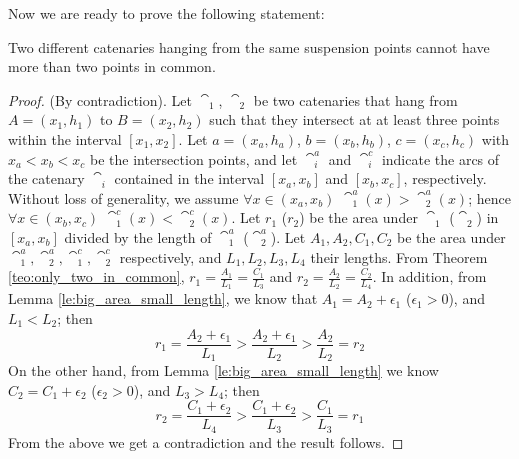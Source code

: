 Now we are ready to prove the following statement:
\begin{theorem}\label{teo:only_two_in_common}
Two different catenaries hanging from the same suspension points cannot have more than two points in common.
\end{theorem}
\begin{proof}
    (By contradiction). Let $\cat_1$, $\cat_2$ be two catenaries that hang from $A=(x_1, h_1)$ to $B=(x_2, h_2)$ such that they intersect at at least three points within the interval $[x_1, x_2]$. Let $a=(x_a, h_a)$, $b=(x_b, h_b)$, $c=(x_c, h_c)$ with $x_a<x_b<x_c$ be the intersection points,
    and let $\cat_i^a$ and $\cat_i^c$ indicate the arcs of the catenary $\cat_i$ contained in the interval $[x_a, x_b]$ and $[x_b, x_c]$, respectively. Without loss of generality, we assume $\forall x\in (x_a, x_b)$ $\cat_1^a(x)> \cat_2^a(x)$; hence $\forall x\in (x_b, x_c)$ $\cat_1^c(x)< \cat_2^c(x)$. Let $r_1$ ($r_2$) be the area under $\cat_1$ ($\cat_2$) in $[x_a, x_b]$ divided by the length of $\cat_1^a$ ($\cat_2^a$). Let $A_1, A_2, C_1, C_2$ be the area under $\cat_1^a,\cat_2^a, \cat_1^c,\cat_2^c$ respectively, and $L_1, L_2, L_3, L_4$ their lengths. From Theorem \ref{teo:only_two_in_common}, $r_1=\frac{A_1}{L_1}=\frac{C_1}{L_3}$ and $r_2=\frac{A_2}{L_2}=\frac{C_2}{L_4}$. In addition, from Lemma \ref{le:big_area_small_length}, we know that $A_1=A_2+\epsilon_1$ ($\epsilon_1>0$), and $L_1<L_2$; then 
    \begin{equation}
    r_1=\frac{A_2+\epsilon_1}{L_1}>\frac{A_2+\epsilon_1}{L_2}>\frac{A_2}{L_2}=r_2  
    \end{equation}
    \noindent On the other hand, from Lemma \ref{le:big_area_small_length} we know $C_2=C_1+\epsilon_2$ ($\epsilon_2>0$), and $L_3>L_4$; then 
    \begin{equation}
    r_2=\frac{C_1+\epsilon_2}{L_4}>\frac{C_1+\epsilon_2}{L_3}>\frac{C_1}{L_3}=r_1
    \end{equation}
    \noindent From the above we get 
    a contradiction and the result follows. 
\end{proof}


